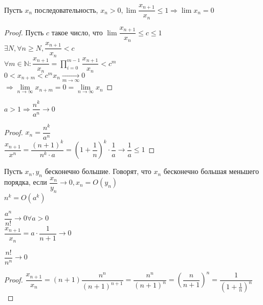 
\begin{theorem}
	Пусть $x_n$ последовательность, $ x_n > 0, \lim \dfrac{x_{n+1}}{x_n} \leq 1 \Rightarrow \lim x_n = 0 $
	\begin{proof}
		Пусть $ c $ такое число, что $  \lim \dfrac{x_{n+1}}{x_n} \leq c \leq 1 $ \\
		$ \exists N, \forall n \geq N,  \dfrac{x_{n+1}}{x_n} < c $ \\
		$ \forall m \in \mathbb{N} :  \dfrac{x_{n+1}}{x_n} = \prod_{i=0}^{m-1}  \dfrac{x_{n+1}}{x_n} < c^m $ \\
		$ 0 < x_{n+m} < c^mx_n \underset{m \rightarrow \infty}{\rightarrow} 0 $ \\
		$ \Rightarrow \lim\limits_{n \rightarrow \infty} x_{n+m} = 0 =  \lim\limits_{n \rightarrow \infty} x_{n} $

	\end{proof}
	\begin{consequence}
		$ a > 1 \Rightarrow \dfrac{n^k}{a^n} \rightarrow 0 $
		\begin{proof}
			$ x_n = \dfrac{n^k}{a^n} $ \\
			$ \dfrac{x_{n+1}}{x^n} = \dfrac{(n+1)^k}{n^k \cdot a} = (1 + \dfrac{1}{n})^k \cdot \dfrac{1}{a} \rightarrow \dfrac{1}{a} \leq 1 $
		\end{proof}
	\end{consequence}
\end{theorem}
\begin{definition}
	Пусть $ x_n, y_n $ бесконечно большие. Говорят, что $ x_n $ бесконечно большая меньшего порядка, если $ \dfrac{x_n}{y_n} \rightarrow 0, x_n = O(y_n) $ \\
	$ n^k = O(a^k) $ 
\end{definition}
\begin{consequence}
$ \dfrac{a^n}{n!} \rightarrow 0 \forall a > 0 $ \\

$ \dfrac{x_{n+1}}{x_n} = a \cdot \dfrac{1}{n+1} \rightarrow 0 $ 
\end{consequence}
\begin{consequence}
	$ \dfrac{n!}{n^n} \rightarrow 0 $ \\
	\begin{proof}
		$ \dfrac{x_{n+1}}{x_n} = (n+1)\dfrac{n^n}{(n+1)^{n+1}} = \dfrac{n^n}{(n+1)^n} = (\dfrac{n}{n+1})^n = \dfrac{1}{(1+\frac{1}{n})^n} $
	\end{proof}
	
\end{consequence}

